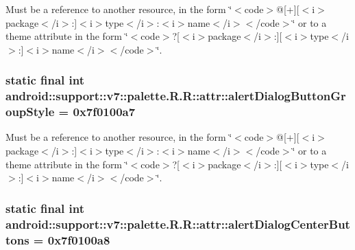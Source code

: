Must be a reference to another resource, in the form \char`\"{}$<$code$>$@\mbox{[}+\mbox{]}\mbox{[}$<$i$>$package$<$/i$>$:\mbox{]}$<$i$>$type$<$/i$>$:$<$i$>$name$<$/i$>$$<$/code$>$\char`\"{} or to a theme attribute in the form \char`\"{}$<$code$>$?\mbox{[}$<$i$>$package$<$/i$>$:\mbox{]}\mbox{[}$<$i$>$type$<$/i$>$:\mbox{]}$<$i$>$name$<$/i$>$$<$/code$>$\char`\"{}. \hypertarget{classandroid_1_1support_1_1v7_1_1palette_1_1_r_1_1attr_c7511f3aeeab55100ed2c678db2266a9}{
\subsubsection[{alertDialogButtonGroupStyle}]{\setlength{\rightskip}{0pt plus 5cm}static final int android::support::v7::palette.R.R::attr::alertDialogButtonGroupStyle = 0x7f0100a7}}
\label{classandroid_1_1support_1_1v7_1_1palette_1_1_r_1_1attr_c7511f3aeeab55100ed2c678db2266a9}


Must be a reference to another resource, in the form \char`\"{}$<$code$>$@\mbox{[}+\mbox{]}\mbox{[}$<$i$>$package$<$/i$>$:\mbox{]}$<$i$>$type$<$/i$>$:$<$i$>$name$<$/i$>$$<$/code$>$\char`\"{} or to a theme attribute in the form \char`\"{}$<$code$>$?\mbox{[}$<$i$>$package$<$/i$>$:\mbox{]}\mbox{[}$<$i$>$type$<$/i$>$:\mbox{]}$<$i$>$name$<$/i$>$$<$/code$>$\char`\"{}. \hypertarget{classandroid_1_1support_1_1v7_1_1palette_1_1_r_1_1attr_cf18559fcb2e0a383730f8f0b1c4a298}{
\subsubsection[{alertDialogCenterButtons}]{\setlength{\rightskip}{0pt plus 5cm}static final int android::support::v7::palette.R.R::attr::alertDialogCenterButtons = 0x7f0100a8}}
\label{classandroid_1_1support_1_1v7_1_1palette_1_1_r_1_1attr_cf18559fcb2e0a383730f8f0b1c4a298}


